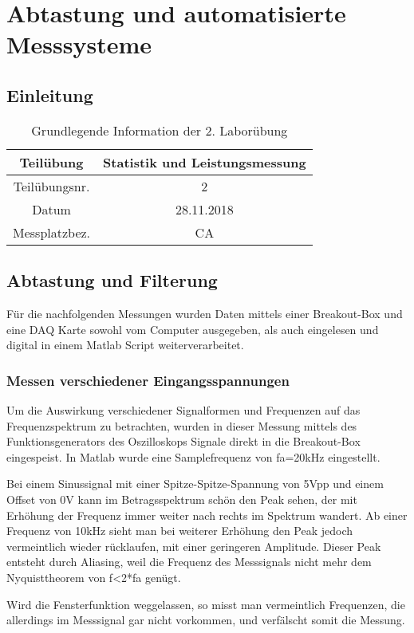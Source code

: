 \chapter{Abtastung und automatisierte Messsysteme}
\section{Einleitung}

\begin{table}[]
	\centering
	\begin{tabular}{|c|c|}
		\hline 
		Teilübung 	& Statistik und Leistungsmessung \\
		\hline 
		Teilübungsnr. 		& 2	 \\ 
		\hline 
		Datum 		& 28.11.2018 \\ 
		\hline 
		Messplatzbez. 	& CA \\
		\hline
	\end{tabular} 
	\caption{Grundlegende Information der 2. Laborübung}
\end{table}



\section{Abtastung und Filterung}
Für die nachfolgenden Messungen wurden Daten mittels einer Breakout-Box und eine DAQ Karte sowohl vom Computer ausgegeben, als auch eingelesen und digital in einem Matlab Script weiterverarbeitet.
\subsection{Messen verschiedener Eingangsspannungen}
Um die Auswirkung verschiedener Signalformen und Frequenzen auf das Frequenzspektrum zu betrachten, wurden in dieser Messung mittels des Funktionsgenerators des Oszilloskops Signale direkt in die Breakout-Box eingespeist. In Matlab wurde eine Samplefrequenz von fa=20kHz eingestellt.

Bei einem Sinussignal mit einer Spitze-Spitze-Spannung von 5Vpp und einem Offset von 0V kann im Betragsspektrum schön den Peak sehen, der mit Erhöhung der Frequenz immer weiter nach rechts im Spektrum wandert. Ab einer Frequenz von 10kHz sieht man bei weiterer Erhöhung den Peak jedoch vermeintlich wieder rücklaufen, mit einer geringeren Amplitude. Dieser Peak entsteht durch Aliasing, weil die Frequenz des Messsignals nicht mehr dem Nyquisttheorem von f<2*fa genügt.

Wird die Fensterfunktion weggelassen, so misst man vermeintlich Frequenzen, die allerdings im Messsignal gar nicht vorkommen, und verfälscht somit die Messung.


